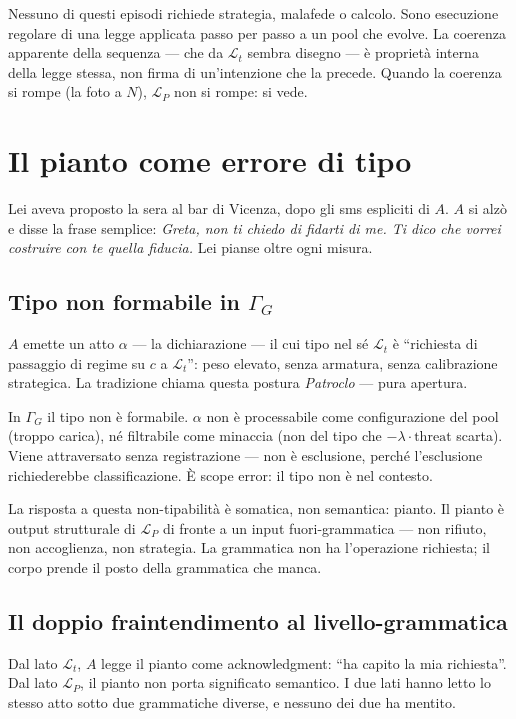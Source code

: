 \documentclass[
    oneside,                 %
    openany,                 %
    titlepage,
    11pt,
    a4paper,
    italian,
    DIV=14,                  %
    headinclude,
    footinclude=true,
    cleardoublepage=empty
]{scrbook}
\theoremstyle{ctplain}
\theoremstyle{ctdef}
\theoremstyle{ctrem}
\newcommand{\Lt}{\mathcal{L}_t}
\newcommand{\LP}{\mathcal{L}_P}
\newcommand{\GammaG}{\Gamma_G}
\begin{document}
\bigskip

Nessuno di questi episodi richiede strategia, malafede o calcolo. Sono esecuzione regolare di una legge applicata passo per passo a un pool che evolve. La coerenza apparente della sequenza --- che da $\Lt$ sembra disegno --- è proprietà interna della legge stessa, non firma di un'intenzione che la precede. Quando la coerenza si rompe (la foto a $N$), $\LP$ non si rompe: si vede.

\chapter{Il pianto come errore di tipo}

Lei aveva proposto la sera al bar di Vicenza, dopo gli sms espliciti di $A$. $A$ si alzò e disse la frase semplice: \emph{Greta, non ti chiedo di fidarti di me. Ti dico che vorrei costruire con te quella fiducia.} Lei pianse oltre ogni misura.

\section*{Tipo non formabile in $\GammaG$}

$A$ emette un atto $\alpha$ --- la dichiarazione --- il cui tipo nel sé $\Lt$ è ``richiesta di passaggio di regime su $c$ a $\Lt$'': peso elevato, senza armatura, senza calibrazione strategica. La tradizione chiama questa postura \emph{Patroclo} --- pura apertura.

In $\GammaG$ il tipo non è formabile. $\alpha$ non è processabile come configurazione del pool (troppo carica), né filtrabile come minaccia (non del tipo che $-\lambda \cdot \mathrm{threat}$ scarta). Viene attraversato senza registrazione --- non è esclusione, perché l'esclusione richiederebbe classificazione. È scope error: il tipo non è nel contesto.

La risposta a questa non-tipabilità è somatica, non semantica: pianto. Il pianto è output strutturale di $\LP$ di fronte a un input fuori-grammatica --- non rifiuto, non accoglienza, non strategia. La grammatica non ha l'operazione richiesta; il corpo prende il posto della grammatica che manca.

\section*{Il doppio fraintendimento al livello-grammatica}

Dal lato $\Lt$, $A$ legge il pianto come acknowledgment: ``ha capito la mia richiesta''. Dal lato $\LP$, il pianto non porta significato semantico. I due lati hanno letto lo stesso atto sotto due grammatiche diverse, e nessuno dei due ha mentito.
\end{document}

